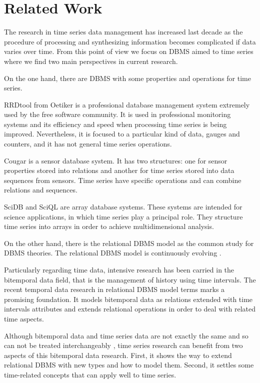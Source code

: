 \section{Related Work}

The research in time series data management has increased last decade
as the procedure of processing and synthesizing information becomes
complicated if data varies over time. From this point of view we focus
on DBMS aimed to time series where we find two main perspectives in
current research.


On the one hand, there are DBMS with some properties and operations
for time series.

RRDtool from Oetiker \cite{rrdtool} is a professional database
management system extremely used by the free software community. It is
used in professional monitoring systems and its efficiency and speed
when processing time series is being improved. Nevertheless, it is
focused to a particular kind of data, gauges and counters, and it has
not general time series operations.

Cougar \cite{bonnet01} is a sensor database system. It has two
structures: one for sensor properties stored into relations and
another for time series stored into data sequences from sensors.  Time
series have specific operations and can combine relations and
sequences.


SciDB \cite{stonebraker09:scidb} and SciQL \cite{zhang11} are array
database systems. These systems are intended for science applications,
in which time series play a principal role. They structure time series
into arrays in order to achieve multidimensional analysis.



On the other hand, there is the relational DBMS model as the common
study for DBMS theories. The relational DBMS model is continuously
evolving \cite{date:thethirdmanifesto}.

Particularly regarding time data,
intensive research has been carried in the bitemporal data field, that
is the management of history using time intervals.  The recent
temporal data research in relational DBMS model terms
\cite{date02:_tempor_data_relat_model} marks a promising
foundation. It models bitemporal data as relations extended with time
intervals attributes and extends relational operations in order to
deal with related time aspects.

Although bitemporal data and time series data are not exactly the same
and so can not be treated interchangeably \cite{schmidt95},
time series research can benefit from two aspects of this bitemporal
data research. First, it shows the way to extend relational DBMS with
new types and how to model them. Second, it settles some time-related
concepts that can apply well to time series.







